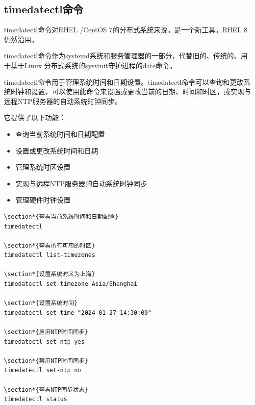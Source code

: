\documentclass[12pt,UTF8]{ctexbook}
\begin{document}
\subsection{timedatectl命令}
timedatectl命令对RHEL /CentOS 7的分布式系统来说，是一个新工具，RHEL 8仍然沿用。

timedatectl命令作为systemd系统和服务管理器的一部分，代替旧的、传统的、用于基于Linux 分布式系统的sysvinit守护进程的date命令。

timedatectl命令用于管理系统时间和日期设置。timedatectl命令可以查询和更改系统时钟和设置，可以使用此命令来设置或更改当前的日期、时间和时区，或实现与远程NTP服务器的自动系统时钟同步。

它提供了以下功能：

\begin{itemize}
    \item 查询当前系统时间和日期配置
    \item 设置或更改系统时间和日期
    \item 管理系统时区设置
    \item 实现与远程NTP服务器的自动系统时钟同步
    \item 管理硬件时钟设置
\end{itemize}

\begin{verbatim}
\section*{查看当前系统时间和日期配置}
timedatectl

\section*{查看所有可用的时区}
timedatectl list-timezones

\section*{设置系统时区为上海}
timedatectl set-timezone Asia/Shanghai

\section*{设置系统时间}
timedatectl set-time "2024-01-27 14:30:00"

\section*{启用NTP时间同步}
timedatectl set-ntp yes

\section*{禁用NTP时间同步}
timedatectl set-ntp no

\section*{查看NTP同步状态}
timedatectl status
\end{verbatim}
\end{document}
